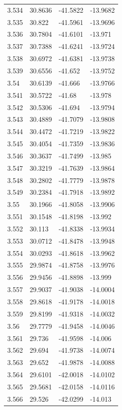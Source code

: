 \begin{tabular}{llll}
3.534 & 30.8636 & -41.5822 & -13.9682 \\
3.535 & 30.822 & -41.5961 & -13.9696 \\
3.536 & 30.7804 & -41.6101 & -13.971 \\
3.537 & 30.7388 & -41.6241 & -13.9724 \\
3.538 & 30.6972 & -41.6381 & -13.9738 \\
3.539 & 30.6556 & -41.652 & -13.9752 \\
3.54 & 30.6139 & -41.666 & -13.9766 \\
3.541 & 30.5722 & -41.68 & -13.978 \\
3.542 & 30.5306 & -41.694 & -13.9794 \\
3.543 & 30.4889 & -41.7079 & -13.9808 \\
3.544 & 30.4472 & -41.7219 & -13.9822 \\
3.545 & 30.4054 & -41.7359 & -13.9836 \\
3.546 & 30.3637 & -41.7499 & -13.985 \\
3.547 & 30.3219 & -41.7639 & -13.9864 \\
3.548 & 30.2802 & -41.7779 & -13.9878 \\
3.549 & 30.2384 & -41.7918 & -13.9892 \\
3.55 & 30.1966 & -41.8058 & -13.9906 \\
3.551 & 30.1548 & -41.8198 & -13.992 \\
3.552 & 30.113 & -41.8338 & -13.9934 \\
3.553 & 30.0712 & -41.8478 & -13.9948 \\
3.554 & 30.0293 & -41.8618 & -13.9962 \\
3.555 & 29.9874 & -41.8758 & -13.9976 \\
3.556 & 29.9456 & -41.8898 & -13.999 \\
3.557 & 29.9037 & -41.9038 & -14.0004 \\
3.558 & 29.8618 & -41.9178 & -14.0018 \\
3.559 & 29.8199 & -41.9318 & -14.0032 \\
3.56 & 29.7779 & -41.9458 & -14.0046 \\
3.561 & 29.736 & -41.9598 & -14.006 \\
3.562 & 29.694 & -41.9738 & -14.0074 \\
3.563 & 29.652 & -41.9878 & -14.0088 \\
3.564 & 29.6101 & -42.0018 & -14.0102 \\
3.565 & 29.5681 & -42.0158 & -14.0116 \\
3.566 & 29.526 & -42.0299 & -14.013 \\

\end{tabular}

